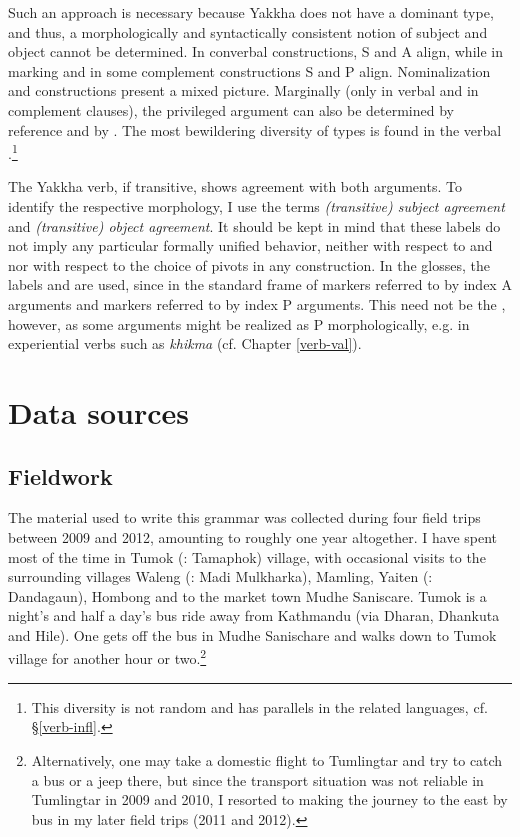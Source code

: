 Such an approach is necessary because Yakkha does not have a dominant  type, and thus, a morphologically and syntactically consistent notion of subject and object cannot be determined. In converbal constructions, S and A align, while in  marking and in some complement constructions S and P align. Nominalization and  constructions present a mixed picture. Marginally (only in verbal  and in complement clauses), the  privileged argument can also be determined by reference and by . The most bewildering diversity of  types is found in the verbal .\footnote{This diversity is not random and has parallels in the related languages, cf. §\ref{verb-infl}.}   


The Yakkha verb, if transitive, shows agreement with both arguments. To identify the respective morphology, I use the terms \emph{(transitive) subject agreement}  and \emph{(transitive) object agreement}. It should be kept in mind that these labels do not imply any particular formally unified behavior, neither with respect to  and  nor with respect to the choice of pivots in any construction. In the glosses,  the labels  and  are used, since in the standard frame of  markers referred to by  index A arguments and markers referred to by  index P arguments. This need not be the , however, as some  arguments might be realized as P morphologically, e.g. in experiential verbs such as \emph{khikma}  (cf. Chapter \ref{verb-val}).


\section{Data sources}\label{sources}

\subsection{Fieldwork}

The material used to write this grammar was collected during four field trips between 2009 and 2012, amounting to roughly one year altogether. I have spent most of the time in Tumok (: Tamaphok) village, with occasional visits to the surrounding villages Waleng (: Madi Mulkharka), Mamling, Yaiten (:  Dandagaun), Hombong and to the market town Mudhe Saniscare. Tumok is a night's and half a day's bus ride away from Kathmandu (via Dharan, Dhankuta and Hile). One gets off the bus in  Mudhe Sanischare and walks down to Tumok village for another hour or two.\footnote{Alternatively, one may take a domestic flight to Tumlingtar and try to catch a bus or a jeep there, but since the transport situation was not reliable in Tumlingtar in 2009 and 2010, I resorted to making the journey to the east by bus in my later field trips (2011 and 2012).}


